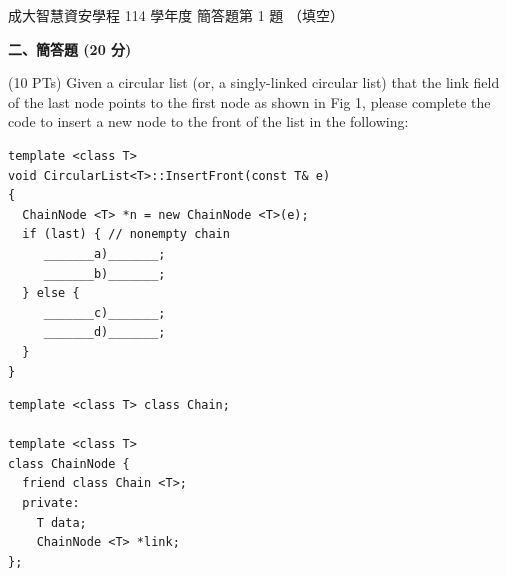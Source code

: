 \begin{pastexam}[label={px:ncku-114-isec-ds-17}]{成大智慧資安學程 114 學年度 簡答題第 1 題}
（填空）

\textbf{二、簡答題 (20 分)}

(10 PTs) Given a circular list (or, a singly-linked circular list) that the link field of the last node
points to the first node as shown in Fig 1, please complete the code to insert a new node to the front of
the list in the following:

\begin{minipage}[t]{0.55\textwidth}
\begin{verbatim}
template <class T>
void CircularList<T>::InsertFront(const T& e)
{
  ChainNode <T> *n = new ChainNode <T>(e);
  if (last) { // nonempty chain
     _______a)_______;
     _______b)_______;
  } else {
     _______c)_______;
     _______d)_______;
  }
}
\end{verbatim}
\end{minipage}\hfill
\begin{minipage}[t]{0.4\textwidth}
\begin{verbatim}
template <class T> class Chain;

template <class T>
class ChainNode {
  friend class Chain <T>;
  private:
    T data;
    ChainNode <T> *link;
};
\end{verbatim}
\end{minipage}

\begin{center}
\end{center}
\end{pastexam}

